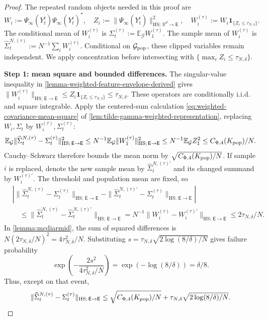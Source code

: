 \begin{proof}
The repeated random objects needed in this proof are
\[
 W_i:=\Psi_\infty(Y_t^i)\Psi_\infty(Y_t^i)^*,\quad
 Z_i:=\|\Psi_\infty(Y_t^i)\|_{\mathrm{HS};\,\mathbb R^d\to\mathsf E}^2,\quad
 W_i^{(\tau)}:=W_i\mathbf1_{\{Z_i\le\tau_{N,\delta}\}}.
\]
The conditional mean of $W_i^{(\tau)}$ is
$\Sigma_t^{(\tau)}:=\mathbb E_{\mathcal G}W_1^{(\tau)}$.
The sample mean of $W_i^{(\tau)}$ is
$\widehat\Sigma_t^{N,(\tau)}:=N^{-1}\sum_iW_i^{(\tau)}$.
Conditional on $\mathcal G_{\rm pop}$, these clipped variables remain
independent. We apply concentration before intersecting with
$\{\max_iZ_i\le\tau_{N,\delta}\}$.

\par\noindent\textbf{Step 1: mean square and bounded differences.}
The singular-value inequality in
\cref{lemma-weighted-feature-envelope-derived} gives
$\|W_i^{(\tau)}\|_{\mathrm{HS};\,\mathsf E\to\mathsf E}\le Z_i\mathbf1_{\{Z_i\le\tau_{N,\delta}\}}
\le\tau_{N,\delta}$. These operators are conditionally i.i.d. and
square integrable. Apply the centered-sum calculation
\eqref{eq:weighted-covariance-mean-square} of
\cref{lem:tilde-gamma-weighted-representation}, replacing
$W_i,\Sigma_t$ by $W_i^{(\tau)},\Sigma_t^{(\tau)}$:
\[
 \mathbb E_{\mathcal G}
 \|\widehat\Sigma_t^{N,(\tau)}-\Sigma_t^{(\tau)}\|_{\mathrm{HS};\,\mathsf E\to\mathsf E}^2
 \le N^{-1}\mathbb E_{\mathcal G}\|W_1^{(\tau)}\|_{\mathrm{HS};\,\mathsf E\to\mathsf E}^2
 \le N^{-1}\mathbb E_{\mathcal G}Z_1^2
 \le C_{\Phi,4}(K_{\rm pop})/N.
\]
Cauchy--Schwarz therefore bounds the mean norm by
$\sqrt{C_{\Phi,4}(K_{\rm pop})/N}$.
If sample $i$ is replaced, denote the new sample mean by
$\widehat\Sigma_t^{N,(\tau)\prime}$ and its changed summand by
$W_i^{(\tau)\prime}$. The threshold and population mean are fixed, so
\[
\begin{aligned}
 &\left|\|\widehat\Sigma_t^{N,(\tau)}-\Sigma_t^{(\tau)}\|_{\mathrm{HS};\,\mathsf E\to\mathsf E}
 -\|\widehat\Sigma_t^{N,(\tau)\prime}-\Sigma_t^{(\tau)}\|_{\mathrm{HS};\,\mathsf E\to\mathsf E}\right|\\
 &\quad\le\|\widehat\Sigma_t^{N,(\tau)}-
                        \widehat\Sigma_t^{N,(\tau)\prime}\|_{\mathrm{HS};\,\mathsf E\to\mathsf E}
 =N^{-1}\|W_i^{(\tau)}-W_i^{(\tau)\prime}\|_{\mathrm{HS};\,\mathsf E\to\mathsf E}
 \le 2\tau_{N,\delta}/N.
\end{aligned}
\]
In \cref{lemma:mcdiarmid}, the sum of squared differences is
$N(2\tau_{N,\delta}/N)^2=4\tau_{N,\delta}^2/N$. Substituting
$s=\tau_{N,\delta}\sqrt{2\log(8/\delta)/N}$ gives failure probability
\[
 \exp\left(-\frac{2s^2}{4\tau_{N,\delta}^2/N}\right)
 =\exp(-\log(8/\delta))=\delta/8.
\]
Thus, except on that event,
\[
 \|\widehat\Sigma_t^{N,(\tau)}-\Sigma_t^{(\tau)}\|_{\mathrm{HS};\,\mathsf E\to\mathsf E}
 \le\sqrt{C_{\Phi,4}(K_{\rm pop})/N}
       +\tau_{N,\delta}\sqrt{2\log(8/\delta)/N}.
\]


\end{proof}

